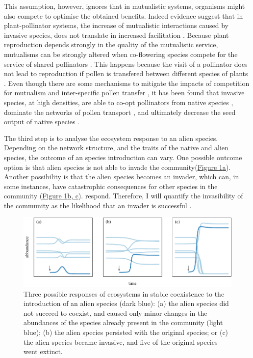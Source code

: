 \documentclass[a4paper]{article}
\begin{document}
This assumption, however, ignores that in mutualistic systems, organisms might also compete to optimise the obtained benefits.
Indeed evidence suggest that in plant-pollinator systems, the increase of mutualistic interactions caused by invasive species, does not translate in increased facilitation \cite{Lopezaraiza-Mikel2007}.
Because plant reproduction depends strongly in the quality of the mutualistic service, mutualisms can be strongly altered when co-flowering species compete for the service of shared pollinators \cite{Sargent2008, Mitchell2009}.
This happens because the visit of a pollinator does not lead to reproduction if pollen is transfered between different species of plants \cite{Morales2008}.
Even though there are some mechanisms to mitigate the impacts of competition for mutualism and inter-specific pollen transfer \cite{Ghazoul2006, Bartomeus2008a}, it has been found that invasive species, at high densities, are able to co-opt pollinators from native species \cite{Pysek2011}, dominate the networks of pollen transport \cite{Lopezaraiza-Mikel2007, Alarcon2010}, and ultimately decrease the seed output of native species \cite{Munoz2008}.

The third step is to analyse the ecosystem response to an alien species.
Depending on the network structure, and the traits of the native and alien species, the outcome of an species introduction can vary.
One possible outcome option is that alien species is not able to invade the community(\hyperref[fig:dynamics]{Figure \ref{fig:dynamics}a}).
Another possibility is that the alien species becomes an invader, which can, in some instances, have catastrophic consequences for other species in the community (\hyperref[fig:dynamics]{Figure \ref{fig:dynamics}b, c}).
respond.
Therefore, I will quantify the invasibility of the community as the likelihood that an invader is successful \autocite{Ives2007, Romanuk2009}.

\begin{figure}[tbp]
  \includegraphics{dynamics}
  \caption{
  \label{fig:dynamics}
  Three possible responses of ecosystems in stable coexistence to the introduction of an alien species (dark blue):
  (a) the alien species did not succeed to coexist, and caused only minor changes in the abundances of the species already present in the community (light blue);
  (b) the alien species persisted with the original species; or
  (c) the alien species became invasive, and five of the original species went extinct.
  }
\end{figure}
\end{document}
